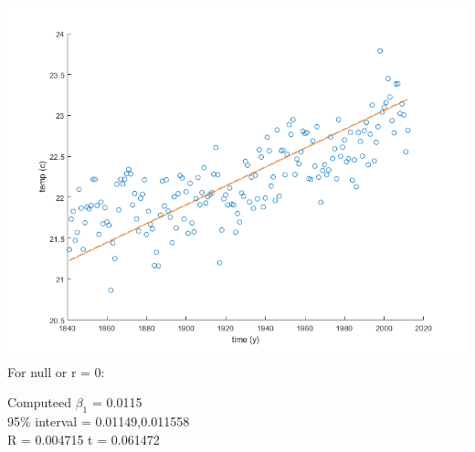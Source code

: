\documentclass[11pt]{article}
\begin{document}
\begin{preview}
\includegraphics[width=\textwidth]{plt.png}
For null or r = 0:

Computeed $\beta_1$ = 0.0115 \\
95\% interval = 0.01149,0.011558 \\
R = 0.004715
t = 0.061472

\end{preview}
\end{document}
